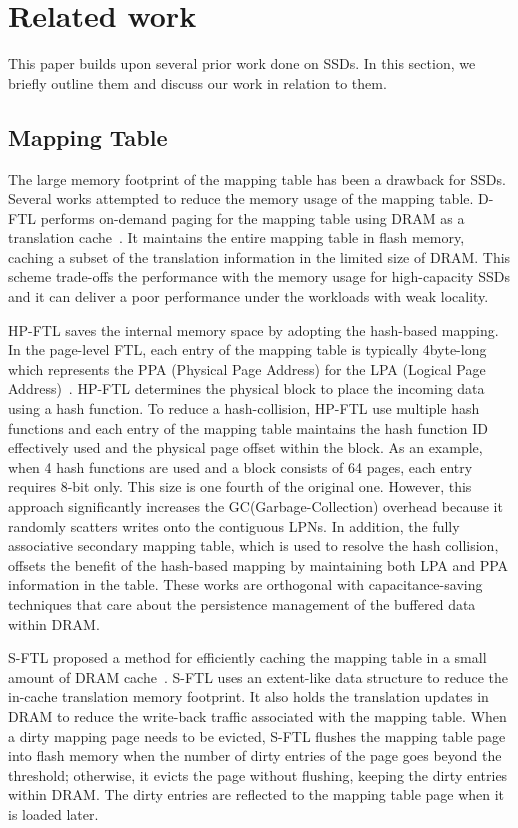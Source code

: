 \section{Related work}

This paper builds upon several prior work done on SSDs. In this section, we briefly outline them and discuss our work in relation to them.

\subsection{Mapping Table}
The large memory footprint of the mapping table has been a drawback for SSDs.
Several works attempted to reduce the memory usage of the mapping table. 
D-FTL performs on-demand paging for the mapping table using DRAM as a translation cache~\cite{gupta2009dftl}.
It maintains the entire mapping table in flash memory, caching a subset of the translation information in the limited size of DRAM.
This scheme trade-offs the performance with the memory usage for high-capacity SSDs and it can deliver a poor performance under the workloads with weak locality. 

HP-FTL saves the internal memory space by adopting the hash-based mapping. In the page-level FTL, each entry of the mapping table is typically 4byte-long which represents the PPA (Physical Page Address) for the LPA (Logical Page Address)~\cite{ni2017hash}. 
HP-FTL determines the physical block to place the incoming data using a hash function. To reduce a hash-collision, HP-FTL use multiple hash functions and each entry of the mapping table maintains the hash function ID effectively used and the physical page offset within the block. As an example, when 4 hash functions are used and a block consists of 64 pages, each entry requires 8-bit only. This size is one fourth of the original one. However, this approach significantly increases the GC(Garbage-Collection) overhead because it randomly scatters writes onto the contiguous LPNs. 
In addition, the fully associative secondary mapping table, which is used to resolve the hash collision, offsets the benefit of the hash-based mapping by maintaining both LPA and PPA information in the table. 
These works are orthogonal with capacitance-saving techniques that care about the persistence management of the buffered data within DRAM.

S-FTL proposed a method for efficiently caching the mapping table in a small amount of DRAM cache~\cite{jiang2011s}. S-FTL uses an extent-like data structure to reduce the in-cache translation memory footprint. It also holds the translation updates in DRAM to reduce the write-back traffic associated with the mapping table. When a dirty mapping page needs to be evicted, S-FTL flushes the mapping table page into flash memory when the number of dirty entries of the page goes beyond the threshold; otherwise, it evicts the page without flushing, keeping the dirty entries within DRAM. The dirty entries are reflected to the mapping table page when it is loaded later. 

